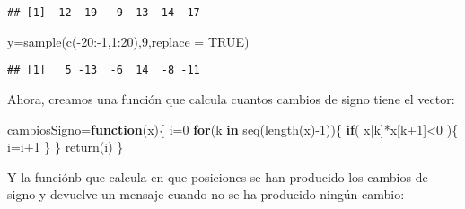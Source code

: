 \documentclass[
]{article}
\newenvironment{Shaded}{\begin{snugshade}}{\end{snugshade}}
\newcommand{\AttributeTok}[1]{\textcolor[rgb]{0.77,0.63,0.00}{#1}}
\newcommand{\ConstantTok}[1]{\textcolor[rgb]{0.00,0.00,0.00}{#1}}
\newcommand{\ControlFlowTok}[1]{\textcolor[rgb]{0.13,0.29,0.53}{\textbf{#1}}}
\newcommand{\DecValTok}[1]{\textcolor[rgb]{0.00,0.00,0.81}{#1}}
\newcommand{\FunctionTok}[1]{\textcolor[rgb]{0.00,0.00,0.00}{#1}}
\newcommand{\NormalTok}[1]{#1}
\newcommand{\OtherTok}[1]{\textcolor[rgb]{0.56,0.35,0.01}{#1}}
\newcommand{\SpecialCharTok}[1]{\textcolor[rgb]{0.00,0.00,0.00}{#1}}
\begin{document}
\begin{verbatim}
## [1] -12 -19   9 -13 -14 -17
\end{verbatim}

\begin{Shaded}
\begin{Highlighting}[]
\NormalTok{y}\OtherTok{=}\FunctionTok{sample}\NormalTok{(}\FunctionTok{c}\NormalTok{(}\SpecialCharTok{{-}}\DecValTok{20}\SpecialCharTok{:{-}}\DecValTok{1}\NormalTok{,}\DecValTok{1}\SpecialCharTok{:}\DecValTok{20}\NormalTok{),}\DecValTok{9}\NormalTok{,}\AttributeTok{replace =} \ConstantTok{TRUE}\NormalTok{)}
\end{Highlighting}
\end{Shaded}

\begin{verbatim}
## [1]   5 -13  -6  14  -8 -11
\end{verbatim}

Ahora, creamos una función que calcula cuantos cambios de signo tiene el
vector:

\begin{Shaded}
\begin{Highlighting}[]
\NormalTok{cambiosSigno}\OtherTok{=}\ControlFlowTok{function}\NormalTok{(x)\{}
\NormalTok{i}\OtherTok{=}\DecValTok{0}
  \ControlFlowTok{for}\NormalTok{(k }\ControlFlowTok{in} \FunctionTok{seq}\NormalTok{(}\FunctionTok{length}\NormalTok{(x)}\SpecialCharTok{{-}}\DecValTok{1}\NormalTok{))\{}
    \ControlFlowTok{if}\NormalTok{( x[k]}\SpecialCharTok{*}\NormalTok{x[k}\SpecialCharTok{+}\DecValTok{1}\NormalTok{]}\SpecialCharTok{\textless{}}\DecValTok{0}\NormalTok{ )\{}
\NormalTok{      i}\OtherTok{=}\NormalTok{i}\SpecialCharTok{+}\DecValTok{1}
\NormalTok{    \}}
\NormalTok{  \}}
\FunctionTok{return}\NormalTok{(i)}
\NormalTok{\}}
\end{Highlighting}
\end{Shaded}

Y la funciónb que calcula en que posiciones se han producido los cambios
de signo y devuelve un mensaje cuando no se ha producido ningún cambio:
\end{document}
